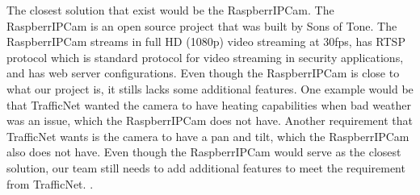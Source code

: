 The closest solution that exist would be the RaspberrIPCam. The RaspberrIPCam is an open source project that was built by Sons of Tone. The RaspberrIPCam streams in full HD (1080p) video streaming at 30fps, has RTSP protocol which is standard protocol for video streaming in security applications, and has web server configurations. Even though the RaspberrIPCam is close to what our project is, it stills lacks some additional features. One example would be that TrafficNet wanted the camera to have heating capabilities when bad weather was an issue, which the RaspberrIPCam does not have. Another requirement that TrafficNet wants is the camera to have a pan and tilt, which the RaspberrIPCam also does not have. Even though the RaspberrIPCam would serve as the closest solution, our team still needs to add additional features to meet the requirement from TrafficNet. \cite{Rubin2012}.
